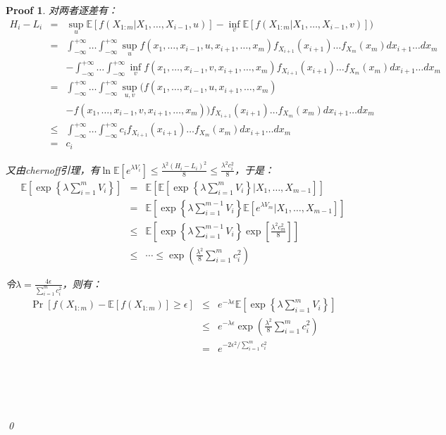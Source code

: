 \documentclass[a4paper,UTF8]{article}
\numberwithin{equation}{section}
\newtheorem*{myProof}{Proof}
\begin{document}
\begin{myProof}
对两者逐差有：
\begin{eqnarray*}
H_i - L_i &=& \sup_u\mathbb{E}[f(X_{1:m}|X_1, \ldots, X_{i-1}, u) ] - \inf_v\mathbb{E}[f(X_{1:m}|X_1, \ldots, X_{i-1}, v) ]) \\
&=& \int_{-\infty}^{+\infty}\ldots\int_{-\infty}^{+\infty} \sup_u f(x_1, \ldots, x_{i-1}, u, x_{i+1}, \ldots, x_m) f_{X_{i+1}}(x_{i+1}) \ldots f_{X_{m}}(x_m) d x_{i+1} \ldots d x_m \\
&& - \int_{-\infty}^{+\infty}\ldots\int_{-\infty}^{+\infty} \inf_v f(x_1, \ldots, x_{i-1}, v, x_{i+1}, \ldots, x_m) f_{X_{i+1}}(x_{i+1}) \ldots f_{X_{m}}(x_m) d x_{i+1} \ldots d x_m \\
&=& \int_{-\infty}^{+\infty}\ldots\int_{-\infty}^{+\infty} \sup_{u,v} (f(x_1, \ldots, x_{i-1}, u, x_{i+1}, \ldots, x_m) \\
&& - f(x_1, \ldots, x_{i-1}, v, x_{i+1}, \ldots, x_m) ) f_{X_{i+1}}(x_{i+1}) \ldots f_{X_{m}}(x_m) d x_{i+1} \ldots d x_m \\
&\le& \int_{-\infty}^{+\infty}\ldots\int_{-\infty}^{+\infty} c_i f_{X_{i+1}}(x_{i+1}) \ldots f_{X_{m}}(x_m) d x_{i+1} \ldots d x_m \\
&=& c_i
\end{eqnarray*}

又由chernoff引理，有$\ln \mathbb{E}[e^{\lambda V_i}] \le \frac{\lambda^2(H_i - L_i)^2}{8} \le \frac{\lambda^2c_i^2}{8}$，于是：
\begin{eqnarray*}
\mathbb{E}\left[ \exp\left\{\lambda\sum_{i=1}^m V_i\right\} \right] &=& \mathbb{E} \left[ \mathbb{E}\left[ \exp\left\{\lambda\sum_{i=1}^m V_i\right\} | X_1, \ldots, X_{m-1} \right] \right] \\
&=& \mathbb{E} \left[ \exp\left\{\lambda\sum_{i=1}^{m-1} V_i\right\} \mathbb{E}\left[ e^{\lambda V_m} | X_1, \ldots, X_{m-1} \right] \right] \\
&\le& \mathbb{E} \left[ \exp\left\{\lambda\sum_{i=1}^{m-1} V_i\right\} \exp [ \frac{\lambda^2c_m^2}{8} ] \right] \\
&\le& \cdots \le \exp ( \frac{\lambda^2}{8} \sum_{i=1}^m c_i^2 )
\end{eqnarray*}

令$\lambda = \frac{4\epsilon}{\sum_{i=1}^{m} c_i^2}$，则有：
\begin{eqnarray*}
\Pr[f(X_{1:m})-\mathbb{E}[f(X_{1:m})] \geq \epsilon] &\le& e^{-\lambda \epsilon} \mathbb{E}\left[ \exp\left\{\lambda\sum_{i=1}^m V_i\right\} \right] \\
&\le& e^{-\lambda \epsilon} \exp ( \frac{\lambda^2}{8} \sum_{i=1}^m c_i^2 ) \\
&=& e^{-2\epsilon^2/\sum_{i=1}^mc_i^2}
\end{eqnarray*}

	~\\
	~\\
	~\\
	~\\
	\qed
	\end{myProof}
\end{document}
